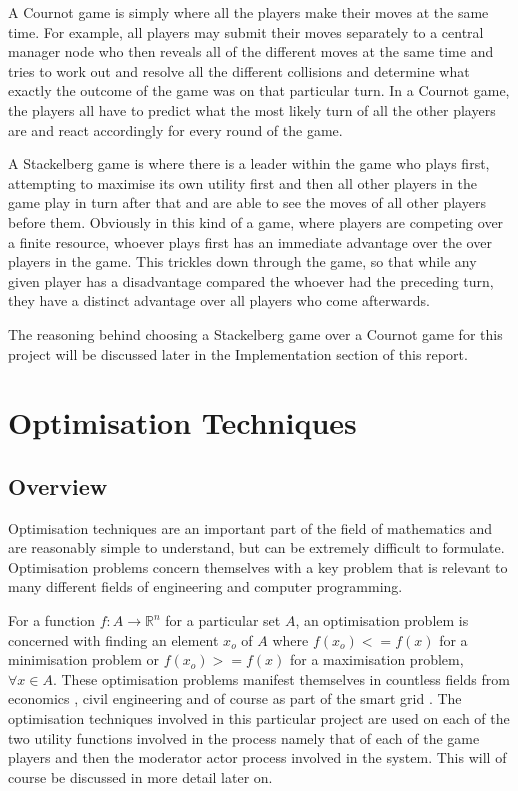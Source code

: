 \documentclass[a4paper, notitlepage]{report}
\begin{document}
A Cournot game is simply where all the players make their moves at the same
time. For example, all players may submit their moves separately to a central
manager node who then reveals all of the different moves at the same time and
tries to work out and resolve all the different collisions and determine what
exactly the outcome of the game was on that particular turn. In a Cournot game,
the players all have to predict what the most likely turn of all the other
players are and react accordingly for every round of the game.

A Stackelberg game is where there is a leader within the game who plays first,
attempting to maximise its own utility first and then all other players in the
game play in turn after that and are able to see the moves of all other players
before them. Obviously in this kind of a game, where players are competing over
a finite resource, whoever plays first has an immediate advantage over the over
players in the game. This trickles down through the game, so that while any
given player has a disadvantage compared the whoever had the preceding turn,
they have a distinct advantage over all players who come afterwards.

The reasoning behind choosing a Stackelberg game over a Cournot game for this
project will be discussed later in the Implementation section of this report.
\chapter{Optimisation Techniques}
\label{sec:orgb792ab2}
\section{Overview}
\label{sec:org0c76f74}
Optimisation techniques are an important part of the field of mathematics and
are reasonably simple to understand, but can be extremely difficult to
formulate. Optimisation problems concern themselves with a key problem that is
relevant to many different fields of engineering and computer programming.

For a function \(f \colon A \rightarrow \mathbb{R}^n\) for a particular set \(A\),
an optimisation problem is concerned with finding an element \(x_o\) of \(A\) where
\(f(x_o) <= f(x)\) for a minimisation problem or \(f(x_o) >= f(x)\) for a
maximisation problem, \(\forall x \in A\). These optimisation problems manifest
themselves in countless fields from economics \cite{dixit1990optimization}, civil
engineering \cite{piryonesi2017mathematical} and of course as part of the smart
grid \cite{ahat2013smart}. The optimisation techniques involved in this particular
project are used on each of the two utility functions involved in the process
namely that of each of the game players and then the moderator actor process
involved in the system. This will of course be discussed in more detail later on.
\end{document}
